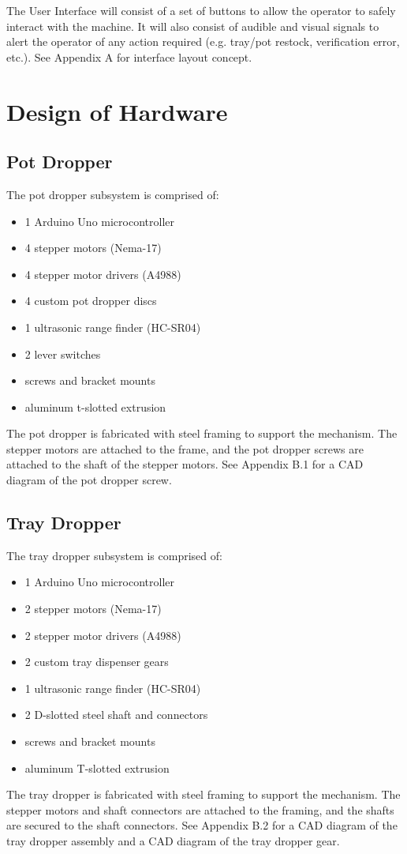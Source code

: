 \documentclass[12pt, titlepage]{article}
\begin{document}
The User Interface will consist of a set of buttons to allow the operator to safely 
interact with the machine. It will also consist of audible and visual signals to alert
the operator of any action required (e.g. tray/pot restock, verification error, etc.).
See Appendix A for interface layout concept.

\section{Design of Hardware}

\subsection{Pot Dropper}

The pot dropper subsystem is comprised of:
\begin{itemize}
  \item 1 Arduino Uno microcontroller
  \item 4 stepper motors (Nema-17)
  \item 4 stepper motor drivers (A4988)
  \item 4 custom pot dropper discs
  \item 1 ultrasonic range finder (HC-SR04)
  \item 2 lever switches
  \item screws and bracket mounts
  \item aluminum t-slotted extrusion
\end{itemize}
The pot dropper is fabricated with steel framing to support the mechanism. The stepper
 motors are attached to the frame, and the pot dropper screws are attached to the shaft 
of the stepper motors. See Appendix B.1 for a CAD diagram of the pot dropper screw.

\subsection{Tray Dropper}

The tray dropper subsystem is comprised of:
\begin{itemize}
  \item 1 Arduino Uno microcontroller
  \item 2 stepper motors (Nema-17)
  \item 2 stepper motor drivers (A4988)
  \item 2 custom tray dispenser gears
  \item 1 ultrasonic range finder (HC-SR04)
  \item 2 D-slotted steel shaft and connectors
  \item screws and bracket mounts
  \item aluminum T-slotted extrusion
\end{itemize}
The tray dropper is fabricated with steel framing to support the mechanism. The 
stepper motors and shaft connectors are attached to the framing, and the shafts 
are secured to the shaft connectors. See Appendix B.2 for a CAD diagram of the tray dropper assembly 
and a CAD diagram of the tray dropper gear.
\end{document}
